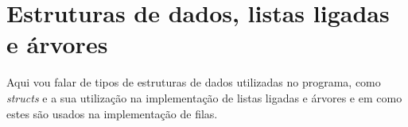 
\section{Estruturas de dados, listas ligadas e árvores}

Aqui vou falar de tipos de estruturas de dados utilizadas no programa, como
\emph{structs} e a sua utilização na implementação de listas ligadas e árvores e em como
estes são usados na implementação de filas.
